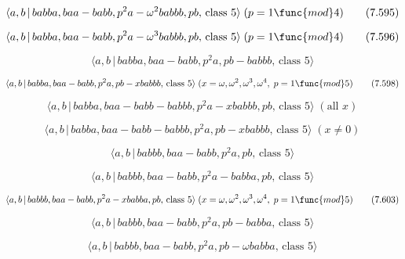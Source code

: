 \documentclass[10pt]{article}
\begin{document}
\begin{equation}
\langle a,b\,|\,babba,baa-babb,p^{2}a-\omega ^{2}babbb,pb,\,\text{class }%
5\rangle \;(p=1\func{mod}4)  \tag{7.595}
\end{equation}

\begin{equation}
\langle a,b\,|\,babba,baa-babb,p^{2}a-\omega ^{3}babbb,pb,\,\text{class }%
5\rangle \;(p=1\func{mod}4)  \tag{7.596}
\end{equation}

\begin{equation}
\langle a,b\,|\,babba,baa-babb,p^2a,pb-babbb,\,\text{class }5\rangle 
\tag{7.597}
\end{equation}

\begin{equation}
\langle a,b\,|\,babba,baa-babb,p^{2}a,pb-xbabbb,\,\text{class }5\rangle
\;(x=\omega ,\omega ^{2},\omega ^{3},\omega ^{4},\;p=1\func{mod}5) 
\tag{7.598}
\end{equation}

\begin{equation}
\langle a,b\,|\,babba,baa-babb-babbb,p^2a-xbabbb,pb,\,\text{class }5\rangle
\;(\text{all }x)  \tag{7.599}
\end{equation}

\begin{equation}
\langle a,b\,|\,babba,baa-babb-babbb,p^2a,pb-xbabbb,\,\text{class }5\rangle
\;(x \neq 0)  \tag{7.600}
\end{equation}

\begin{equation}
\langle a,b\,|\,babbb,baa-babb,p^2a,pb,\,\text{class }5\rangle  \tag{7.601}
\end{equation}

\begin{equation}
\langle a,b\,|\,babbb,baa-babb,p^2a-babba,pb,\,\text{class }5\rangle 
\tag{7.602}
\end{equation}

\begin{equation}
\langle a,b\,|\,babbb,baa-babb,p^{2}a-xbabba,pb,\,\text{class }5\rangle
\;(x=\omega ,\omega ^{2},\omega ^{3},\omega ^{4},\;p=1\func{mod}5) 
\tag{7.603}
\end{equation}

\begin{equation}
\langle a,b\,|\,babbb,baa-babb,p^2a,pb-babba,\,\text{class }5\rangle 
\tag{7.604}
\end{equation}

\begin{equation}
\langle a,b\,|\,babbb,baa-babb,p^{2}a,pb-\omega babba,\,\text{class }5\rangle
\tag{7.605}
\end{equation}
\end{document}
